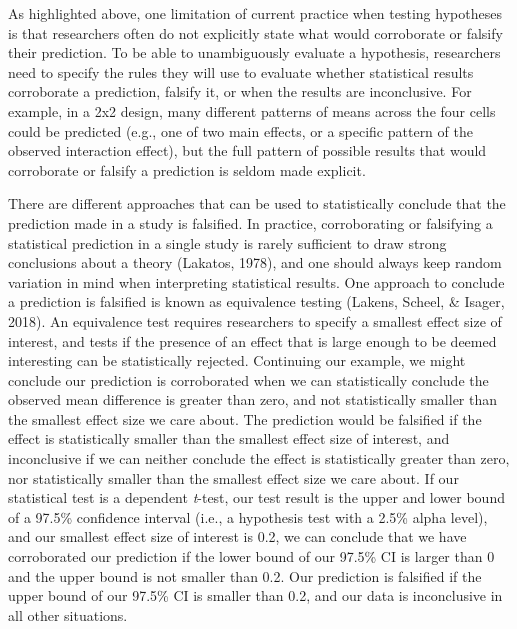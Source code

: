\documentclass[
  english,
  doc,floatsintext]{apa6}
\begin{document}
As highlighted above, one limitation of current practice when testing hypotheses is that researchers often do not explicitly state what would corroborate or falsify their prediction. To be able to unambiguously evaluate a hypothesis, researchers need to specify the rules they will use to evaluate whether statistical results corroborate a prediction, falsify it, or when the results are inconclusive. For example, in a 2x2 design, many different patterns of means across the four cells could be predicted (e.g., one of two main effects, or a specific pattern of the observed interaction effect), but the full pattern of possible results that would corroborate or falsify a prediction is seldom made explicit.

There are different approaches that can be used to statistically conclude that the prediction made in a study is falsified. In practice, corroborating or falsifying a statistical prediction in a single study is rarely sufficient to draw strong conclusions about a theory (Lakatos, 1978), and one should always keep random variation in mind when interpreting statistical results. One approach to conclude a prediction is falsified is known as equivalence testing (Lakens, Scheel, \& Isager, 2018). An equivalence test requires researchers to specify a smallest effect size of interest, and tests if the presence of an effect that is large enough to be deemed interesting can be statistically rejected. Continuing our example, we might conclude our prediction is corroborated when we can statistically conclude the observed mean difference is greater than zero, and not statistically smaller than the smallest effect size we care about. The prediction would be falsified if the effect is statistically smaller than the smallest effect size of interest, and inconclusive if we can neither conclude the effect is statistically greater than zero, nor statistically smaller than the smallest effect size we care about. If our statistical test is a dependent \emph{t}-test, our test result is the upper and lower bound of a 97.5\% confidence interval (i.e., a hypothesis test with a 2.5\% alpha level), and our smallest effect size of interest is 0.2, we can conclude that we have corroborated our prediction if the lower bound of our 97.5\% CI is larger than 0 and the upper bound is not smaller than 0.2. Our prediction is falsified if the upper bound of our 97.5\% CI is smaller than 0.2, and our data is inconclusive in all other situations.
\end{document}
